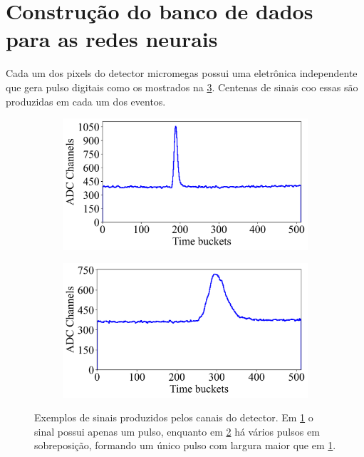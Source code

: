 \documentclass[a4paper,12pt,oneside]{book}
\begin{document}
\section{Construção do banco de dados para as redes neurais}\label{sec:pulses_trad}

\par Cada um dos pixels do detector micromegas possui uma eletrônica independente que gera pulso digitais como os mostrados na \ref{fig:exemplos_sinais}. Centenas de sinais coo essas são produzidas em cada um dos eventos.

\begin{figure}[H]
\centering
    \begin{subfigure}[b]{0.48\textwidth}
        \centering
        \includegraphics[scale=0.395]{figs/ex_sinal_1.png}
        \caption{}
        \label{subfig:exemplos_sinais_1}
    \end{subfigure}%
    \hfill
    \begin{subfigure}[b]{0.48\textwidth}
        \centering
        \includegraphics[scale=0.395]{figs/ex_sinal_2.png}
        \caption{}
        \label{subfig:exemplos_sinais_2}
    \end{subfigure}
\caption{Exemplos de sinais produzidos pelos canais do detector. Em \ref{subfig:exemplos_sinais_1} o sinal possui apenas um pulso, enquanto em \ref{subfig:exemplos_sinais_2} há vários pulsos em sobreposição, formando um único pulso com largura maior que em \ref{subfig:exemplos_sinais_1}.}
\label{fig:exemplos_sinais}
\end{figure}
\end{document}
